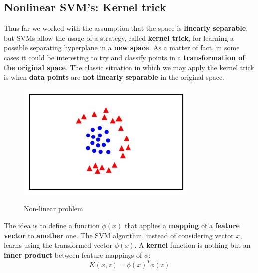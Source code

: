 


\subsection{Nonlinear SVM's: Kernel trick}
Thus far we worked with the assumption that the space is \textbf{linearly separable}, but SVMs allow the usage of a strategy, called \textbf{kernel trick}, for learning a possible separating hyperplane in a \textbf{new space}.
As a matter of fact, in some cases it could be interesting to try and classify points in a \textbf{transformation of the original space}. The classic situation in which we may apply the kernel trick is when \textbf{data points} are \textbf{not} \textbf{linearly separable} in the original space. 

\begin{figure}[h!]
		\centering
		\includegraphics[scale = 1.5]{img/nonlinear svm.jpg}
		\label{svm}
		\caption{Non-linear problem}
\end{figure}

The idea is to define a function $\phi(x)$ that applies a \textbf{mapping} of a \textbf{feature vector} to \textbf{another} one. The SVM algorithm, instead of considering vector $x$, learns using the transformed vector $\phi(x)$. A \textbf{kernel} function is nothing but an \textbf{inner product} between feature mappings of $\phi$:
$$K(x,z) = \phi(x)^T\phi(z)$$

